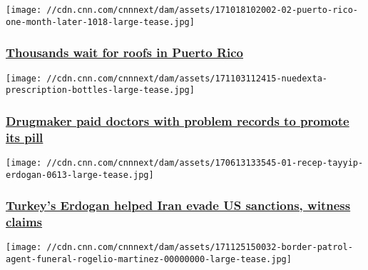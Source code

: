 \texttt{[image: //cdn.cnn.com/cnnnext/dam/assets/171018102002-02-puerto-rico-one-month-later-1018-large-tease.jpg]}

\hypertarget{thousands-wait-for-roofs-in-puerto-rico}{%
\subsubsection{\texorpdfstring{\href{/2017/12/06/politics/puerto-rico-blue-roof-contract-invs/index.html}{Thousands
wait for roofs in Puerto
Rico}}{Thousands wait for roofs in Puerto Rico}}\label{thousands-wait-for-roofs-in-puerto-rico}}

\href{/2017/12/04/health/nuedexta-doctors-payments-invs/index.html}{}

\texttt{[image: //cdn.cnn.com/cnnnext/dam/assets/171103112415-nuedexta-prescription-bottles-large-tease.jpg]}

\hypertarget{drugmaker-paid-doctors-with-problem-records-to-promote-its-pill}{%
\subsubsection{\texorpdfstring{\href{/2017/12/04/health/nuedexta-doctors-payments-invs/index.html}{Drugmaker
paid doctors with problem records to promote its
pill}}{Drugmaker paid doctors with problem records to promote its pill}}\label{drugmaker-paid-doctors-with-problem-records-to-promote-its-pill}}

\href{/2017/11/30/middleeast/reza-zarrab-us-trial-erdogan/index.html}{}

\texttt{[image: //cdn.cnn.com/cnnnext/dam/assets/170613133545-01-recep-tayyip-erdogan-0613-large-tease.jpg]}

\hypertarget{turkeys-erdogan-helped-iran-evade-us-sanctions-witness-claims}{%
\subsubsection{\texorpdfstring{\href{/2017/11/30/middleeast/reza-zarrab-us-trial-erdogan/index.html}{Turkey's
Erdogan helped Iran evade US sanctions, witness
claims}}{Turkey's Erdogan helped Iran evade US sanctions, witness claims}}\label{turkeys-erdogan-helped-iran-evade-us-sanctions-witness-claims}}

\href{/2017/11/30/us/no-known-evidence-assault-border-patrol-agent-death-invs/index.html}{}

\texttt{[image: //cdn.cnn.com/cnnnext/dam/assets/171125150032-border-patrol-agent-funeral-rogelio-martinez-00000000-large-tease.jpg]}

